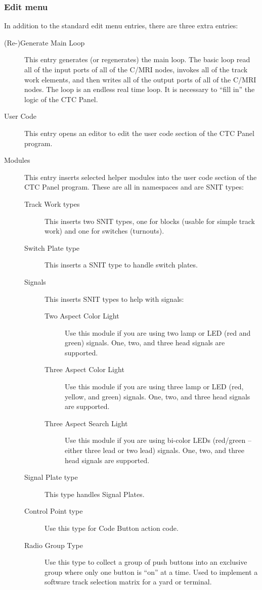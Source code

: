 \subsubsection{Edit menu}

In addition to the standard edit menu entries, there are three extra
entries:

\begin{description}
  \item[(Re-)Generate Main Loop] This entry generates (or regenerates)
the main loop.  The basic loop read all of the input ports of all of the
C/MRI nodes, invokes all of the track work elements, and then writes all
of the output ports of all of the C/MRI nodes.  The loop is an endless
real time loop.  It is necessary to ``fill in'' the logic of the CTC Panel.
  \item[User Code] This entry opens an editor to edit the user code
section of the CTC Panel program.
  \item[Modules] This entry inserts selected helper modules into the
user code section of the CTC Panel program.  These are all in namespaces
and are SNIT types:
    \begin{description}
      \item[Track Work types] This inserts two SNIT types, one for
blocks (usable for simple track work) and one for switches (turnouts).
      \item[Switch Plate type] This inserts a SNIT type to handle switch
plates. 
      \item[Signals] This inserts SNIT types to help with signals:
	\begin{description}
	   \item[Two Aspect Color Light] Use this module if you are
using two lamp or LED (red and green) signals.  One, two, and three head
signals are supported.
	   \item[Three Aspect Color Light] Use this module if you are
using three  lamp or LED (red,  yellow,  and green) signals.  One, two,
and three head signals are supported.
	   \item[Three Aspect Search Light] Use this module if you are 
using bi-color LEDs (red/green -- either three lead or two lead)
signals.  One, two, and three head signals are supported.
	\end{description}
      \item[Signal Plate type] This type handles Signal Plates.
      \item[Control Point type] Use this type for Code Button action code.
      \item[Radio Group Type] Use this type to collect a group of push 
buttons into an exclusive group where only one button is ``on'' at a
time.  Used to implement a software track selection matrix for a yard or
terminal.
    \end{description}
\end{description}

